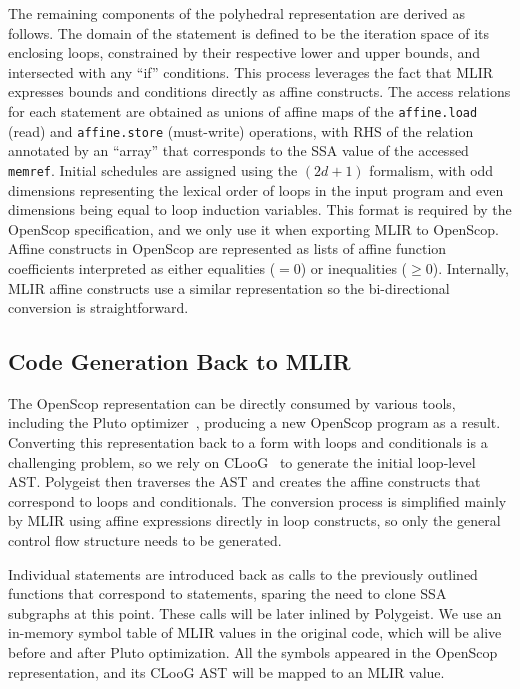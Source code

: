 \documentclass[sigplan]{acmart}
\newcommand{\icode}[1]{{\texttt {#1}}}
\newcommand{\tool}{Polygeist\xspace}
\newcommand{\memref}{\icode{memref}\xspace}
\begin{document}
The remaining components of the polyhedral representation are derived as follows.
The domain of the statement is defined to be the iteration space of its enclosing loops, constrained by their respective lower and upper bounds, and intersected with any ``if'' conditions. This process leverages the fact that MLIR expresses bounds and conditions directly as affine constructs.
The access relations for each statement are obtained as unions of affine maps of the \icode{affine.load} (read) and \icode{affine.store} (must-write) operations, with RHS of the relation annotated by an ``array'' that corresponds to the SSA value of the accessed \memref.
Initial schedules are assigned using the $(2d+1)$ formalism, with odd dimensions representing the lexical order of loops in the input program and even dimensions being equal to loop induction variables.
This format is required by the OpenScop specification, and we only use it when exporting MLIR to OpenScop.
%
Affine constructs in OpenScop are represented as lists of affine function coefficients interpreted as either equalities ($=0$) or inequalities ($\geq 0$). Internally, MLIR affine constructs use a similar representation so the bi-directional conversion is straightforward.


\subsection{Code Generation Back to MLIR}

The OpenScop representation can be directly consumed by various tools, including the Pluto optimizer~\cite{Bondhugula2008Pluto}, producing a new OpenScop program as a result. Converting this representation back to a form with loops and conditionals is a challenging problem, so we rely on CLooG~\cite{cloog} to generate the initial loop-level AST. \tool then traverses the AST and creates the affine constructs that correspond to loops and conditionals. The conversion process is simplified mainly by MLIR using affine expressions directly in loop constructs, so only the general control flow structure needs to be generated.

Individual statements are introduced back as calls to the previously outlined functions that correspond to statements, sparing the need to clone SSA subgraphs at this point. These calls will be later inlined by \tool. We use an in-memory symbol table of MLIR values in the original code, which will be alive before and after Pluto optimization. All the symbols appeared in the OpenScop representation, and its CLooG AST will be mapped to an MLIR value. 
\end{document}
